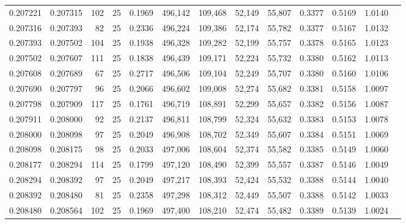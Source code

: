\begin{tabular}{rrrrrrrrrrrrr}
0.207221 & 0.207315 &   102 &  25 &                                     0.1969 & 496,142 & 109,468 &  52,149 &  55,807 & 0.3377 & 0.5169 & 1.0140 \\
0.207316 & 0.207393 &    82 &  25 &                                     0.2336 & 496,224 & 109,386 &  52,174 &  55,782 & 0.3377 & 0.5167 & 1.0132 \\
0.207393 & 0.207502 &   104 &  25 &                                     0.1938 & 496,328 & 109,282 &  52,199 &  55,757 & 0.3378 & 0.5165 & 1.0123 \\
0.207502 & 0.207607 &   111 &  25 &                                     0.1838 & 496,439 & 109,171 &  52,224 &  55,732 & 0.3380 & 0.5162 & 1.0113 \\
0.207608 & 0.207689 &    67 &  25 &                                     0.2717 & 496,506 & 109,104 &  52,249 &  55,707 & 0.3380 & 0.5160 & 1.0106 \\
0.207690 & 0.207797 &    96 &  25 &                                     0.2066 & 496,602 & 109,008 &  52,274 &  55,682 & 0.3381 & 0.5158 & 1.0097 \\
0.207798 & 0.207909 &   117 &  25 &                                     0.1761 & 496,719 & 108,891 &  52,299 &  55,657 & 0.3382 & 0.5156 & 1.0087 \\
0.207911 & 0.208000 &    92 &  25 &                                     0.2137 & 496,811 & 108,799 &  52,324 &  55,632 & 0.3383 & 0.5153 & 1.0078 \\
0.208000 & 0.208098 &    97 &  25 &                                     0.2049 & 496,908 & 108,702 &  52,349 &  55,607 & 0.3384 & 0.5151 & 1.0069 \\
0.208098 & 0.208175 &    98 &  25 &                                     0.2033 & 497,006 & 108,604 &  52,374 &  55,582 & 0.3385 & 0.5149 & 1.0060 \\
0.208177 & 0.208294 &   114 &  25 &                                     0.1799 & 497,120 & 108,490 &  52,399 &  55,557 & 0.3387 & 0.5146 & 1.0049 \\
0.208294 & 0.208392 &    97 &  25 &                                     0.2049 & 497,217 & 108,393 &  52,424 &  55,532 & 0.3388 & 0.5144 & 1.0040 \\
0.208392 & 0.208480 &    81 &  25 &                                     0.2358 & 497,298 & 108,312 &  52,449 &  55,507 & 0.3388 & 0.5142 & 1.0033 \\
0.208480 & 0.208564 &   102 &  25 &                                     0.1969 & 497,400 & 108,210 &  52,474 &  55,482 & 0.3389 & 0.5139 & 1.0024 \\

\end{tabular}
